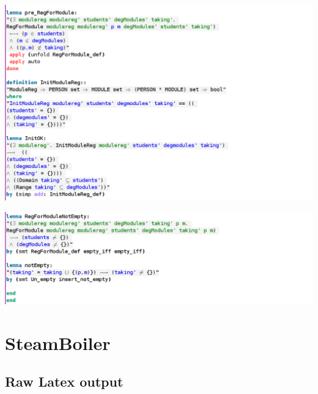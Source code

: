 \noindent \includegraphics[width=15cm]{examples/modulereg/6imagee.png}

\noindent \includegraphics[width=15cm]{examples/modulereg/6imagef.png}

\section{SteamBoiler}
\label{app:steamboiler}


\subsection{Raw Latex output}
\label{app:sb0o}
%


